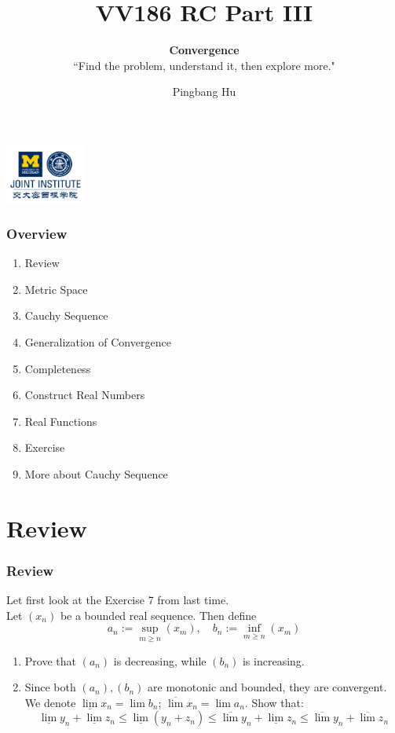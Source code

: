 \documentclass[12pt, t]{beamer}
\title{VV186 RC Part III}
\subtitle{\textbf{Convergence}\\``Find the problem, understand it, then explore more."}
\institute[UM-SJTU JI]{University of Michigan-Shanghai Jiao Tong University Joint Institute}
\author{Pingbang Hu}
\begin{document}
\begin{frame}
    \titlepage
    \begin{center}
        \includegraphics[height=2cm]{Figures/logo/logo2.png}
    \end{center}
\end{frame}

\begin{frame}
    \frametitle{Overview}
    \begin{enumerate}
        \item Review
        \item Metric Space
        \item Cauchy Sequence
        \item Generalization of Convergence
        \item Completeness
        \item Construct Real Numbers
        \item Real Functions
        \item Exercise
        \item More about Cauchy Sequence
    \end{enumerate}
\end{frame}

\section{Review}
\begin{frame}
    \frametitle{Review}
    Let first look at the Exercise 7 from last time. \\
    \vspace{1em}
    Let $(x_n)$ be a bounded real sequence. Then define
    \begin{equation*}
        a_n:=\sup_{m\geq n}(x_m),\quad b_n:=\inf_{m\geq n}(x_m)
    \end{equation*}

    \begin{enumerate}
        \item Prove that $(a_n)$ is decreasing, while $(b_n)$ is increasing.
        \item Since both $(a_n),(b_n)$ are monotonic and bounded, they are convergent.
              We denote $\underline{\lim} x_n=\lim b_n$; $\overline{\lim}x_n=\lim a_n$. Show that:
              \begin{equation*}
                  \underline{\lim}y_n+\underline{\lim}z_n\leq \underline{\lim} (y_n+z_n)\leq\overline{\lim}y_n+\underline{\lim}z_n\leq\overline{\lim}y_n+\overline{\lim}z_n
              \end{equation*}
    \end{enumerate}

\end{frame}
\end{document}
